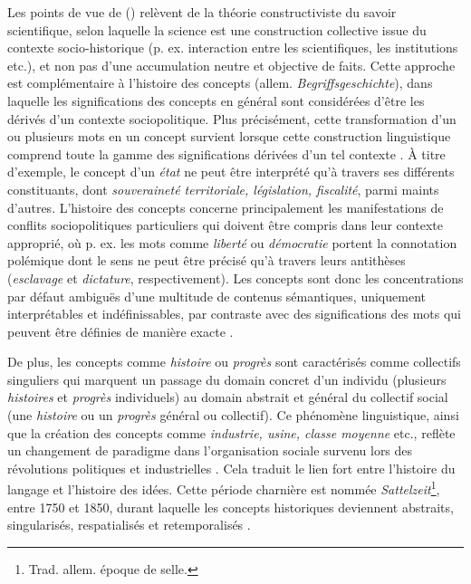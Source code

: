 \begin{description}
Les points de vue de \citeauthor{stengers1987d} (\citeyear{stengers1987d}) relèvent de la théorie constructiviste du savoir scientifique, selon laquelle la science est une \og{}construction\fg{} collective issue du contexte socio-historique (p. ex. interaction entre les scientifiques, les institutions etc.), et non pas d'une accumulation neutre et objective de faits. Cette approche est complémentaire à l'histoire des concepts (allem. \textit{Begriffsgeschichte}), dans laquelle les significations des concepts en général sont considérées d'être les dérivés d'un contexte sociopolitique. Plus précisément, cette transformation d'un ou plusieurs mots en un concept survient lorsque cette construction linguistique comprend toute la gamme des significations dérivées d'un tel contexte \citep[p.~19]{koselleck2011introduction}. À titre d'exemple, le concept d'un \textit{état} ne peut être interprété qu'à travers ses différents constituants, dont \textit{souveraineté territoriale, législation, fiscalité}, parmi maints d'autres. L'histoire des concepts concerne principalement les manifestations de conflits sociopolitiques particuliers qui doivent être compris dans leur contexte approprié, où p. ex. les mots comme \textit{liberté} ou \textit{démocratie} portent la connotation polémique dont le sens ne peut être précisé qu'à travers leurs antithèses (\textit{esclavage} et \textit{dictature}, respectivement). Les concepts sont donc les concentrations par défaut ambiguës d'une multitude de contenus sémantiques, uniquement interprétables et indéfinissables, par contraste avec des significations des mots qui peuvent être définies de manière exacte \citep[p. 20]{koselleck2011introduction}. 

De plus, les concepts comme \textit{histoire} ou \textit{progrès} sont caractérisés comme \og{}collectifs singuliers\fg{} qui marquent un passage du domain concret d'un individu (plusieurs \textit{histoires} et \textit{progrès} individuels) au domain abstrait et général du collectif social (une \textit{histoire} ou un \textit{progrès} général ou collectif). Ce phénomène linguistique, ainsi que la création des concepts comme \textit{industrie, usine, classe moyenne} etc., reflète un changement de paradigme dans l'organisation sociale survenu lors des révolutions politiques et industrielles \citep[p. 1]{hobsbawm2010age}. Cela traduit le lien fort entre l'histoire du langage et l'histoire des idées. 
Cette période charnière est nommée \textit{Sattelzeit}\footnote{Trad. allem. \og{}époque de selle\fg{}.}, entre 1750 et 1850, durant laquelle les concepts historiques deviennent abstraits, singularisés, respatialisés et retemporalisés \citep[pp.~34-35]{koselleck2011introduction}. 


\end{description}
